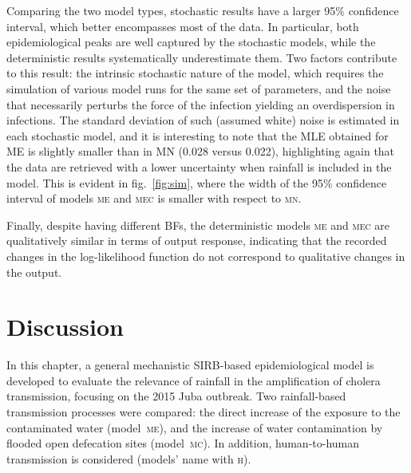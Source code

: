 Comparing the two model types, stochastic results have a larger 95\% confidence interval, which better encompasses most of the data. In particular, both epidemiological peaks are well captured by the stochastic models, while the deterministic results systematically underestimate them. Two factors contribute to this result: the intrinsic stochastic nature of the model, which requires the simulation of various model runs for the same set of parameters, and the noise that necessarily perturbs the force of the infection yielding an overdispersion in infections. The standard deviation of such (assumed white) noise is estimated in each stochastic model, and it is interesting to note that the MLE obtained for \textsc{ME} is slightly smaller than in \textsc{MN} (0.028 versus 0.022), highlighting again that the data are retrieved with a lower uncertainty when rainfall is included in the model. This is evident in fig.~\ref{fig:sim}, where the width of the 95\% confidence interval of models \textsc{me} and \textsc{mec} is smaller with respect to \textsc{mn}.

Finally, despite having different BFs, the deterministic models \textsc{me} and \textsc{mec} are qualitatively similar in terms of output response, indicating that the recorded changes in the log-likelihood function do not correspond to qualitative changes in the output.

\section{Discussion}
\label{sec:disc}

In this chapter, a general mechanistic SIRB-based epidemiological model is developed to evaluate the relevance of rainfall in the amplification of cholera transmission, focusing on the 2015 Juba outbreak. Two rainfall-based transmission processes were compared: the direct increase of the exposure to the contaminated water (model~\textsc{me})\cite{Eisenberg:ExaminingRainfallCholera:2013}, and the increase of water contamination by flooded open defecation sites (model~\textsc{mc})\cite{Rinaldo:Reassessment20102011:2012}. In addition, human-to-human transmission is considered (models' name with \textsc{h}).

